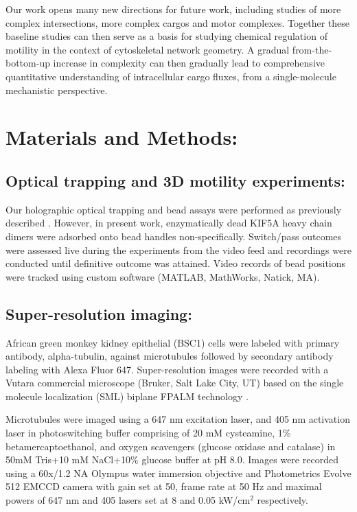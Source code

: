 Our work opens many new directions for future work, including studies of more complex intersections, more complex cargos and motor complexes. Together these baseline studies can then serve as a basis for studying chemical regulation of motility in the context of cytoskeletal network geometry. A gradual from-the-bottom-up increase in complexity can then gradually lead to comprehensive quantitative understanding of intracellular cargo fluxes, from a single-molecule mechanistic perspective.

\section{Materials and Methods:}

\subsection{Optical trapping and 3D motility experiments:}

Our holographic optical trapping and bead assays were performed as previously described \cite{Bergman2015}. However, in present work, enzymatically dead KIF5A heavy chain dimers were adsorbed onto bead handles non-specifically. Switch/pass outcomes were assessed live during the experiments from the video feed and recordings were conducted until definitive outcome was attained. Video records of bead positions were tracked using custom software (MATLAB, MathWorks, Natick, MA).

\subsection{Super-resolution imaging:}

African green monkey kidney epithelial (BSC1) cells were labeled with primary antibody, alpha-tubulin, against microtubules followed by secondary antibody labeling with Alexa Fluor 647. Super-resolution images were recorded with a Vutara commercial microscope (Bruker, Salt Lake City, UT) based on the single molecule localization (SML) biplane FPALM technology \cite{Juette2008,Mlodzianoski2009}.

Microtubules were imaged using a 647 nm excitation laser, and 405 nm activation laser in photoswitching buffer comprising of 20 mM cysteamine, 1\% betamercaptoethanol, and oxygen scavengers (glucose oxidase and catalase) in 50mM Tris+10 mM NaCl+10\% glucose buffer at pH 8.0. Images were recorded using a 60x/1.2 NA Olympus water immersion objective and Photometrics Evolve 512 EMCCD camera with gain set at 50, frame rate at 50 Hz and maximal powers of 647 nm and 405 lasers set at 8 and 0.05 kW/cm$^2$ respectively.


